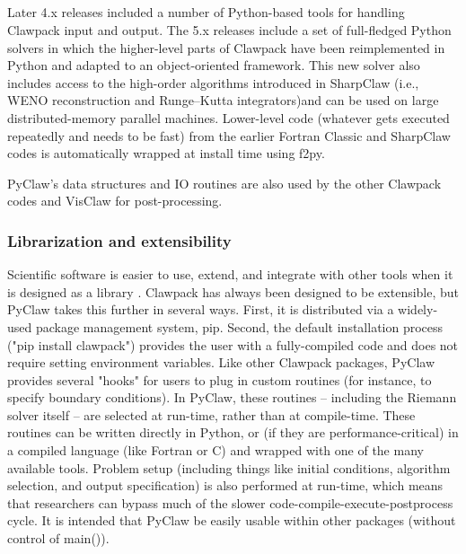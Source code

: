 %
%
%

\subsection{\pyclaw}

Later 4.x releases included a number of Python-based tools for handling
Clawpack input and output.  The 5.x releases include a set of full-fledged Python
solvers in which the higher-level parts of Clawpack have been reimplemented in
Python and adapted to an object-oriented framework.  This new solver also
includes access to the high-order algorithms introduced in SharpClaw (i.e.,
WENO reconstruction and Runge--Kutta integrators)and can be used on large
distributed-memory parallel machines.  Lower-level code (whatever gets executed
repeatedly and needs to be fast) from the earlier Fortran Classic and SharpClaw
codes is automatically wrapped at install time using f2py.

PyClaw's data structures and IO routines are also used by the other Clawpack
codes and VisClaw for post-processing.

\subsubsection{Librarization and extensibility}
Scientific software is easier to use, extend, and integrate with other tools when
it is designed as a library \cite{brown2014run}.  Clawpack has always been designed
to be extensible, but PyClaw takes this further in several ways.  First, it is
distributed via a widely-used package management system, pip.
Second, the default installation process ("pip install clawpack")
provides the user with a fully-compiled code and does not require setting environment
variables.  Like other Clawpack packages, PyClaw provides several "hooks" for users
to plug in custom routines (for instance, to specify boundary conditions).
In PyClaw, these routines -- including the Riemann solver itself -- are selected at
run-time, rather than at compile-time.  These routines can be written directly in
Python, or (if they are performance-critical) in a compiled language (like Fortran or C)
and wrapped with one of the many available tools.  Problem setup (including things like
initial conditions, algorithm selection, and output specification) is also
performed at run-time, which means that researchers can bypass much of the slower
code-compile-execute-postprocess cycle.
It is intended that PyClaw be easily usable within other packages (without control of main()).

